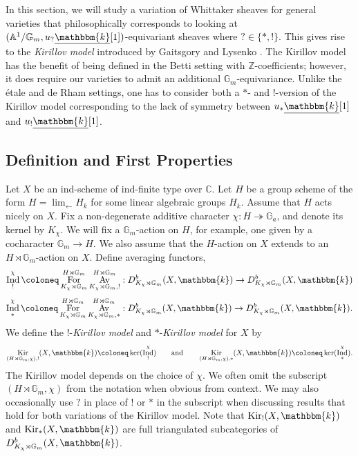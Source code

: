 \documentclass{amsart}
\newcommand{\C}{\mathbb{C}}
\newcommand{\Z}{\mathbb{Z}}
\newcommand{\A}{\mathbb{A}}
\newcommand{\G}{\mathbb{G}}
\renewcommand{\k}{\mathbbm{k}}
\DeclareMathOperator{\Ind}{Ind}
\DeclareMathOperator{\Av}{Av}
\newcommand{\uk}{\underline{\k}}
\DeclareMathOperator{\For}{For}
\newcommand{\ilim}{\lim_{\leftarrow}}
\DeclareMathOperator{\Kir}{Kir}
\theoremstyle{definition}
\begin{document}
    In this section, we will study a variation of Whittaker sheaves for general varieties that philosophically corresponds to looking at $(\A^1/\G_m, u_? \uk [1])$-equivariant sheaves where $? \in \{*,!\}$.
    This gives rise to the \emph{Kirillov model} introduced by Gaitsgory and Lysenko \cite{GaiWhit, GL}. The Kirillov model has the benefit of being defined in the Betti setting with $\Z$-coefficients; however, it does require our varieties to admit an additional $\G_m$-equivariance.
    Unlike the étale and de Rham settings, one has to consider both a $*$- and $!$-version of the Kirillov model corresponding to the lack of symmetry between $u_* \uk [1]$ and $u_! \uk [1]$.
    
    \subsection{Definition and First Properties}\label{subsec:kirillov_def} 
    Let $X$ be an ind-scheme of ind-finite type over $\C$. Let $H$ be a group scheme of the form $H = \ilim H_k$ for some linear algebraic groups $H_k$.
    Assume that $H$ acts nicely on $X$.
    Fix a non-degenerate additive character $\chi : H \twoheadrightarrow \G_a$, and denote its kernel by $K_{\chi}$.
    We will fix a $\G_m$-action on $H$, for example, one given by a cocharacter $\G_m \to H$. 
    We also assume that the $H$-action on $X$ extends to an $H \rtimes \G_m$-action on $X$. Define averaging functors,
    \[\Ind_{!}^{\chi} \coloneq \For_{K_{\chi} \rtimes \G_m}^{H \rtimes \G_m} \Av_{K_{\chi} \rtimes \G_m, !}^{H \rtimes \G_m} : D_{K_{\chi} \rtimes \G_m}^b (X, \k) \to D_{K_{\chi} \rtimes \G_m}^b (X, \k)\]
    \[\Ind_{*}^{\chi} \coloneq \For_{K_{\chi} \rtimes \G_m}^{H \rtimes \G_m} \Av_{K_{\chi} \rtimes \G_m, *}^{H \rtimes \G_m} : D_{K_{\chi} \rtimes \G_m}^b (X, \k) \to D_{K_{\chi} \rtimes \G_m}^b (X, \k).\]
    We define the $!$-\emph{Kirillov model} and $*$-\emph{Kirillov model} for $X$ by
    \[\Kir_{(H \rtimes \G_m, \chi), !} (X, \k) \coloneq \ker (\Ind_{!}^{\chi}) \qquad\text{and}\qquad \Kir_{(H \rtimes \G_m, \chi), *} (X, \k) \coloneq \ker (\Ind_{*}^{\chi}).\]
    The Kirillov model depends on the choice of $\chi$. We often omit the subscript $(H \rtimes \G_m, \chi)$ from the notation when obvious from context.
    We may also occasionally use $?$ in place of $!$ or $*$ in the subscript when discussing results that hold for both variations of the Kirillov model.
    Note that $\Kir_! (X, \k)$ and $\Kir_* (X, \k)$ are full triangulated subcategories of $D_{K_{\chi} \rtimes \G_m}^b (X, \k)$. 
    
\end{document}

